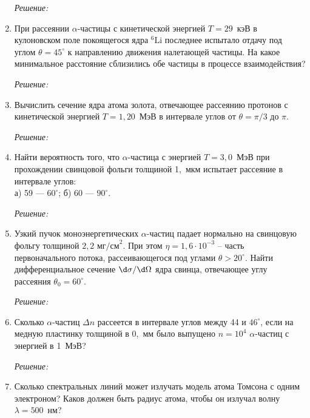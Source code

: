 \begin{enumerate}
\emph{Решение:}

\newpage

\item При рассеянии \( \alpha \)-частицы с кинетической энергией \( T= 29 \)~кэВ
в кулоновском поле покоящегося ядра \( ^6\mathrm{Li} \) последнее испытало
отдачу под углом \( \theta = 45^\circ \) к направлению движения налетающей
частицы. На какое минимальное расстояние сблизились обе частицы в процессе
взаимодействия?

\emph{Решение:}

\newpage

\item Вычислить сечение ядра атома золота, отвечающее рассеянию протонов с
кинетической энергией \( T = 1,\!20 \)~МэВ в интервале углов от
\( \theta = \pi/3 \) до \( \pi \).

\emph{Решение:}

\newpage

\item Найти вероятность того, что \( \alpha \)-частица с энергией
\( T = 3,\!0 \)~МэВ при прохождении свинцовой фольги толщиной 1,~мкм испытает
рассеяние в интервале углов: \\ а) 59 --- \( 60^\circ \);
б) 60 --- \( 90^\circ \).

\emph{Решение:}

\newpage

\item Узкий пучок моноэнергетических \( \alpha \)-частиц падает нормально на
свинцовую фольгу толщиной \( 2,\!2\text{~мг/см}^2 \). При этом
\( \eta = 1,\!6\cdot10^{-3} \) -- часть первоначального потока, рассеивающегося
под углами \( \theta > 20^\circ \). Найти дифференциальное сечение
\( \d\sigma/\d\Omega \) ядра свинца, отвечающее углу рассеяния
\( \theta_0 = 60^\circ \).

\emph{Решение:}

\newpage

\item Сколько \( \alpha \)-частиц \( \Delta n \) рассеется в интервале углов
между 44 и \( 46^\circ \), если на медную пластинку толщиной в 0,~мм было
выпущено \( n = 10^4 \) \( \alpha \)-частиц с энергией в 1~МэВ?

\emph{Решение:}

\newpage

\item Сколько спектральных линий может излучать модель атома Томсона с одним
электроном? Каков должен быть радиус атома, чтобы он излучал волну
\( \lambda = 500 \)~нм?


\end{enumerate}
